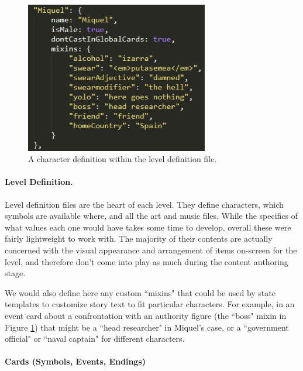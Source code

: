 
\begin{figure}
    \centering
    \includegraphics[width=8cm]{figures/2-Ice-Bound/casting-data.png}
    \caption{A character definition within the level definition file.}
    \label{fig:casting}
\end{figure}


\paragraph{Level Definition.}\label{par:icebound-level-definition}

Level definition files are the heart of each level. They define characters, which symbols are available where, and all the art and music files. While the specifics of what values each one would have takes some time to develop, overall these were fairly lightweight to work with. The majority of their contents are actually concerned with the visual appearance and arrangement of items on-screen for the level, and therefore don't come into play as much during the content authoring stage.

We would also define here any custom ``mixins" that could be used by state templates to customize story text to fit particular characters. For example, in an event card about a confrontation with an authority figure (the ``boss" mixin in Figure \ref{fig:casting}) that might be a ``head researcher" in Miquel's case, or a ``government official" or ``naval captain" for different characters.

\paragraph{Cards (Symbols, Events, Endings)}\label{par:cards-symbols-events-endings}

